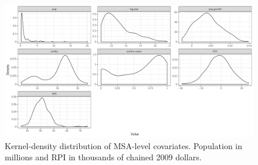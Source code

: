 \documentclass[draft]{agujournal}\usepackage{knitr}
\begin{document}
\begin{figure}[H]
\includegraphics[width=6in]{figures_si/msa_vars_distribution-1} \caption[Kernel-density distribution of MSA-level covariates]{Kernel-density distribution of MSA-level covariates. Population in millions and RPI in thousands of chained 2009 dollars.}\label{fig:msa_vars_distribution}
\end{figure}





\end{document}
